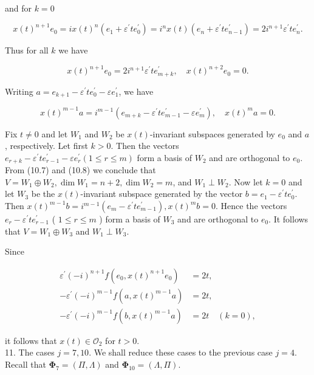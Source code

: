 \documentclass[10pt]{article}
\begin{document}
and for $k=0$

$$
x(t)^{n+1} e_{0}=i x(t)^{n}\left(e_{1}+\varepsilon^{\prime} t e_{0}^{\prime}\right)=i^{n} x(t)\left(e_{n}+\varepsilon^{\prime} t e_{n-1}^{\prime}\right)=2 i^{n+1} \varepsilon^{\prime} t e_{n}^{\prime} .
$$

Thus for all $k$ we have


\begin{equation*}
x(t)^{n+1} e_{0}=2 i^{n+1} \varepsilon^{\prime} t e_{m+k}^{\prime}, \quad x(t)^{n+2} e_{0}=0 . \tag{10.7}
\end{equation*}


Writing $a=e_{k+1}-\varepsilon^{\prime} t e_{0}^{\prime}-\varepsilon e_{1}^{\prime}$, we have


\begin{equation*}
x(t)^{m-1} a=i^{m-1}\left(e_{m+k}-\varepsilon^{\prime} t e_{m-1}^{\prime}-\varepsilon e_{m}^{\prime}\right), \quad x(t)^{m} a=0 . \tag{10.8}
\end{equation*}


Fix $t \neq 0$ and let $W_{1}$ and $W_{2}$ be $x(t)$-invariant subspaces generated by $e_{0}$ and $a$, respectively. Let first $k>0$. Then the vectors $e_{r+k}-\varepsilon^{\prime} t e_{r-1}^{\prime}-\varepsilon e_{r}^{\prime}(1 \leqslant r \leqslant m)$ form a basis of $W_{2}$ and are orthogonal to $e_{0}$. From (10.7) and (10.8) we conclude that $V=W_{1} \oplus W_{2}, \operatorname{dim} W_{1}=n+2, \operatorname{dim} W_{2}=m$, and $W_{1} \perp W_{2}$. Now let $k=0$ and let $W_{3}$ be the $x(t)$-invariant subspace generated by the vector $b=e_{1}-\varepsilon^{\prime} t e_{0}^{\prime}$. Then $x(t)^{m-1} b=i^{m-1}\left(e_{m}-\varepsilon^{\prime} t e_{m-1}^{\prime}\right), x(t)^{m} b=0$. Hence the vectors $e_{r}-\varepsilon^{\prime} t e_{r-1}^{\prime}$ ( $1 \leqslant r \leqslant m$ ) form a basis of $W_{3}$ and are orthogonal to $e_{0}$. It follows that $V=W_{1} \oplus W_{3}$ and $W_{1} \perp W_{3}$.

Since

$$
\begin{aligned}
\varepsilon^{\prime}(-i)^{n+1} f\left(e_{0}, x(t)^{n+1} e_{0}\right) & =2 t, \\
-\varepsilon^{\prime}(-i)^{m-1} f\left(a, x(t)^{m-1} a\right) & =2 t, \\
-\varepsilon^{\prime}(-i)^{m-1} f\left(b, x(t)^{m-1} a\right) & =2 t \quad(k=0),
\end{aligned}
$$

it follows that $x(t) \in \mathcal{O}_{2}$ for $t>0$.\\
11. The cases $j=7,10$. We shall reduce these cases to the previous case $j=4$. Recall that $\boldsymbol{\Phi}_{7}=(\Pi, \Lambda)$ and $\boldsymbol{\Phi}_{10}=(\Lambda, \Pi)$.
\end{document}
